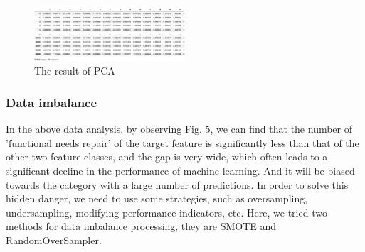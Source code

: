 \documentclass[conference]{IEEEtran}
\begin{document}
\begin{figure}[H]
\centerline{\includegraphics[width=0.5\textwidth]{15.pic.jpg}}
\caption{The result of PCA}
\end{figure}
    
\subsubsection{Data imbalance}

In the above data analysis, by observing Fig. 5, we can find that the number of 'functional needs repair' of the target feature is significantly less than that of the other two feature classes, and the gap is very wide, which often leads to a significant decline in the performance of machine learning. And it will be biased towards the category with a large number of predictions. In order to solve this hidden danger, we need to use some strategies, such as oversampling, undersampling, modifying performance indicators, etc. Here, we tried two methods for data imbalance processing, they are SMOTE and RandomOverSampler.
\end{document}
